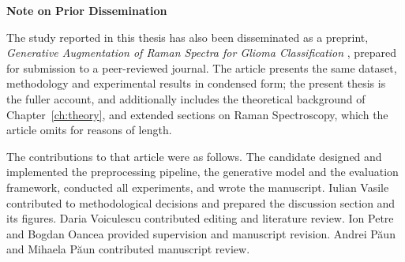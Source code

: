 \cleardoublepage
\thispagestyle{empty}
\vspace*{\fill}

\begin{center}
\textbf{\large Note on Prior Dissemination}
\end{center}
\bigskip

The study reported in this thesis has also been disseminated as a preprint,
\emph{Generative Augmentation of Raman Spectra for Glioma Classification}
\cite{iusan2026raman}, prepared for submission to a peer-reviewed journal. The article
presents the same dataset, methodology and experimental results in condensed form; the
present thesis is the fuller account, and additionally includes the theoretical background
of Chapter~\ref{ch:theory}, and extended sections on Raman Spectroscopy, which the article omits for reasons of length.

\bigskip

The contributions to that article were as follows. The candidate designed and implemented the
preprocessing pipeline, the generative model and the evaluation framework, conducted all
experiments, and wrote the manuscript. Iulian Vasile contributed to methodological decisions
and prepared the discussion section and its figures. Daria Voiculescu contributed editing and
literature review. Ion Petre and Bogdan Oancea provided supervision and manuscript revision.
Andrei Păun and Mihaela Păun contributed manuscript review.

\vfill
\cleardoublepage

